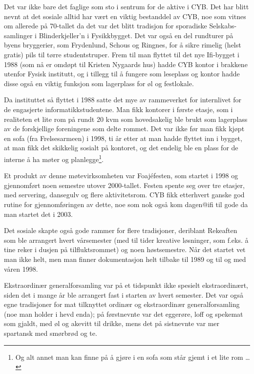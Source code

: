 Det var ikke bare det faglige som sto i sentrum for de aktive i CYB. Det har blitt nevnt at det sosiale alltid har vært en viktig bestanddel av CYB, noe som vitnes om allerede på 70-tallet da det var det blitt tradisjon for sporadiske Selskabs-samlinger i Blinderkjeller’n i Fysikkbygget. Det var også en del rundturer på byens bryggerier, som Frydenlund, Schous og Ringnes, for å sikre rimelig (helst gratis) pils til tørre studentstruper. Frem til man flyttet til det nye Ifi-bygget i 1988 (som nå er omdøpt til Kristen Nygaards hus) hadde CYB kontor i brakkene utenfor Fysisk institutt, og i tillegg til å fungere som leseplass og kontor hadde disse også en viktig funksjon som lagerplass for øl og festlokale.

Da instituttet så flyttet i 1988 satte det mye av rammeverket for internlivet for de engasjerte informatikkstudentene. Man fikk kontorer i første etasje, som i realiteten et lite rom på rundt 20 kvm som hovedsakelig ble brukt som lagerplass av de forskjellige foreningene som delte rommet. Det var ikke før man fikk kjøpt en sofa (fra Frelsesarmeen) i 1998, ti år etter at man hadde flyttet inn i bygget, at man fikk det skikkelig sosialt på kontoret, og det endelig ble en plass for de interne å ha møter og planlegge\footnote{Og alt annet man kan finne på å gjøre i en sofa som står gjemt i et lite rom \dots}.

Et produkt av denne møtevirksomheten var Foajéfesten, som startet i 1998 og gjennomført noen semestre utover 2000-tallet. Festen spente seg over tre etasjer, med servering, dansegulv og flere aktivitetsrom. CYB fikk etterhvert ganske god rutine for gjennomføringen av dette, noe som nok også kom dagen@ifi til gode da man startet det i 2003.

Det sosiale skapte også gode rammer for flere tradisjoner, deriblant Rekeaften som ble arrangert hvert vårsemester (med til tider kreative løsninger, som f.eks. å tine reker i dusjen på tilfluktsrommet) og noen høstsemestre. Når det startet vet man ikke helt, men man finner dokumentasjon helt tilbake til 1989 og til og med våren 1998.

Ekstraordinær generalforsamling var på et tidspunkt ikke spesielt ekstraordinært, siden det i mange år ble arrangert fast i starten av hvert semester. Det var også egne tradisjoner for mat tilknyttet ordinær og ekstraordinær generalforsamling (noe man holder i hevd enda); på førstnevnte var det eggerøre, loff og spekemat som gjaldt, med øl og akevitt til drikke, mens det på sistnevnte var mer spartansk med smørbrød og te.

